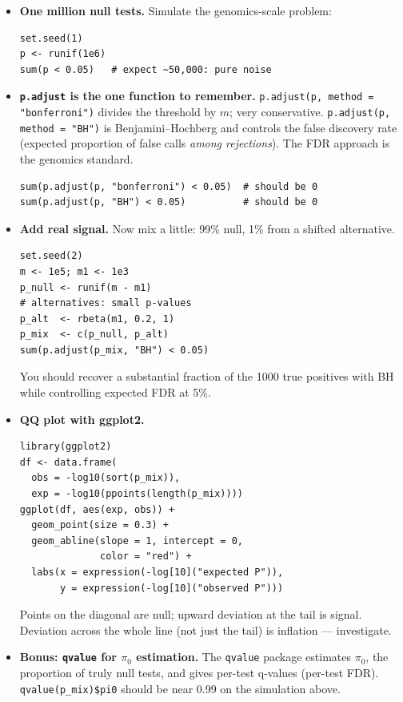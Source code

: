 \begin{itemize}[nosep]
  \item \textbf{One million null tests.} Simulate the genomics-scale problem:
    \begin{lstlisting}
set.seed(1)
p <- runif(1e6)
sum(p < 0.05)   # expect ~50,000: pure noise
    \end{lstlisting}
  \item \textbf{\texttt{p.adjust} is the one function to remember.} \texttt{p.adjust(p, method = "bonferroni")} divides the threshold by $m$; very conservative. \texttt{p.adjust(p, method = "BH")} is Benjamini--Hochberg and controls the false discovery rate (expected proportion of false calls \textit{among rejections}). The FDR approach is the genomics standard.
    \begin{lstlisting}
sum(p.adjust(p, "bonferroni") < 0.05)  # should be 0
sum(p.adjust(p, "BH") < 0.05)          # should be 0
    \end{lstlisting}
  \item \textbf{Add real signal.} Now mix a little: 99\% null, 1\% from a shifted alternative.
    \begin{lstlisting}
set.seed(2)
m <- 1e5; m1 <- 1e3
p_null <- runif(m - m1)
# alternatives: small p-values
p_alt  <- rbeta(m1, 0.2, 1)
p_mix  <- c(p_null, p_alt)
sum(p.adjust(p_mix, "BH") < 0.05)
    \end{lstlisting}
    You should recover a substantial fraction of the 1000 true positives with BH while controlling expected FDR at 5\%.
  \item \textbf{QQ plot with ggplot2.}
    \begin{lstlisting}
library(ggplot2)
df <- data.frame(
  obs = -log10(sort(p_mix)),
  exp = -log10(ppoints(length(p_mix))))
ggplot(df, aes(exp, obs)) +
  geom_point(size = 0.3) +
  geom_abline(slope = 1, intercept = 0,
              color = "red") +
  labs(x = expression(-log[10]("expected P")),
       y = expression(-log[10]("observed P")))
    \end{lstlisting}
    Points on the diagonal are null; upward deviation at the tail is signal. Deviation across the whole line (not just the tail) is inflation --- investigate.
  \item \textbf{Bonus: \texttt{qvalue} for $\pi_0$ estimation.} The \texttt{qvalue} package estimates $\pi_0$, the proportion of truly null tests, and gives per-test q-values (per-test FDR). \texttt{qvalue(p\_mix)\$pi0} should be near 0.99 on the simulation above.
\end{itemize}
